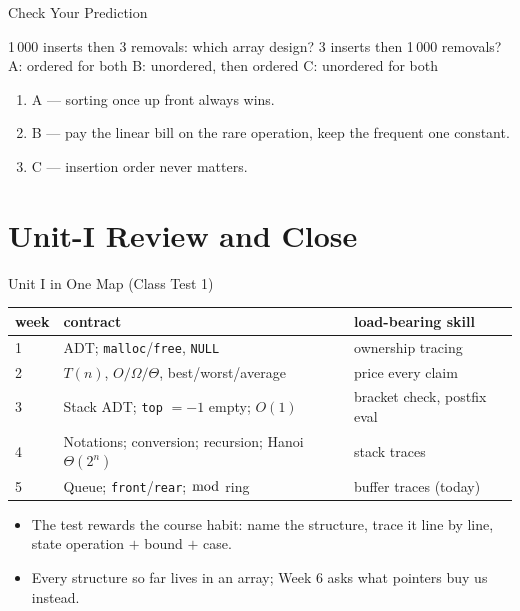\documentclass[aspectratio=169]{beamer}
\begin{document}
\begin{frame}{Check Your Prediction}
  \begin{block}{1\,000 inserts then 3 removals: which array design? 3 inserts
    then 1\,000 removals?}
    A: ordered for both \quad B: unordered, then ordered \quad
    C: unordered for both
  \end{block}
  \begin{enumerate}
    \item A --- sorting once up front always wins.
    \item B --- pay the linear bill on the rare operation, keep the frequent
      one constant.
    \item C --- insertion order never matters.
  \end{enumerate}
\end{frame}


\section{Unit-I Review and Close}

\begin{frame}{Unit I in One Map (Class Test 1)}
  \begin{center}
  {\footnotesize
  \begin{tabular}{lll}
    \toprule
    \textbf{week} & \textbf{contract} & \textbf{load-bearing skill} \\
    \midrule
    1 & ADT; \texttt{malloc}/\texttt{free}, \texttt{NULL} & ownership tracing \\
    2 & $T(n)$, $O/\Omega/\Theta$, best/worst/average & price every claim \\
    3 & Stack ADT; \texttt{top} $= -1$ empty; $O(1)$ & bracket check, postfix eval \\
    4 & Notations; conversion; recursion; Hanoi $\Theta(2^{n})$ & stack traces \\
    5 & Queue; \texttt{front}/\texttt{rear}; $\bmod$ ring & buffer traces (today) \\
    \bottomrule
  \end{tabular}}
  \end{center}
  \begin{itemize}
    \item The test rewards the course habit: name the structure, trace it
      line by line, state operation $+$ bound $+$ case.
    \item Every structure so far lives in an array; Week 6 asks what pointers
      buy us instead.
  \end{itemize}
\end{frame}
\end{document}
